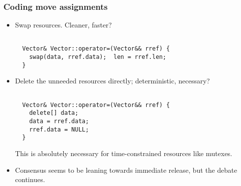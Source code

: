 

\begin{frame}[fragile]
\frametitle{Coding move assignments}
\begin{itemize}[<+->]
\item Swap resources. Cleaner, faster?
{\scriptsize
\begin{verbatim}

  Vector& Vector::operator=(Vector&& rref) {
    swap(data, rref.data);  len = rref.len;
  }

\end{verbatim}
}
\item Delete the unneeded resources directly; deterministic, necessary?
{\scriptsize
\begin{verbatim}

  Vector& Vector::operator=(Vector&& rref) {
    delete[] data;
    data = rref.data;
    rref.data = NULL;
  }
\end{verbatim}
}
This is absolutely necessary for time-constrained resources like
mutexes.

\item Consensus seems to be leaning towards immediate release, but the
debate continues.

\end{itemize}

\end{frame}




